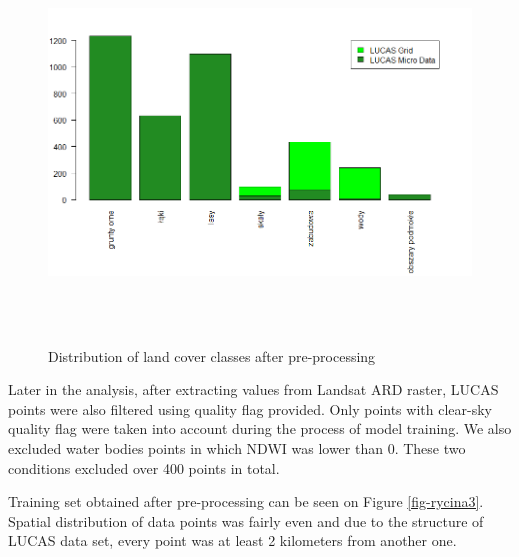 \documentclass{amuthesis}
\begin{document}
\begin{figure}[t]

{\centering \includegraphics[width=1\textwidth,height=4.16667in]{./figures/lucas_data.png}

}

\caption{\label{fig-rycina2}Distribution of land cover classes after
pre-processing}

\end{figure}

Later in the analysis, after extracting values from Landsat ARD raster,
LUCAS points were also filtered using quality flag provided. Only points
with clear-sky quality flag were taken into account during the process
of model training. We also excluded water bodies points in which NDWI
was lower than 0. These two conditions excluded over 400 points in
total.

Training set obtained after pre-processing can be seen on Figure
\ref{fig-rycina3}. Spatial distribution of data points was fairly even
and due to the structure of LUCAS data set, every point was at least 2
kilometers from another one.
\end{document}
